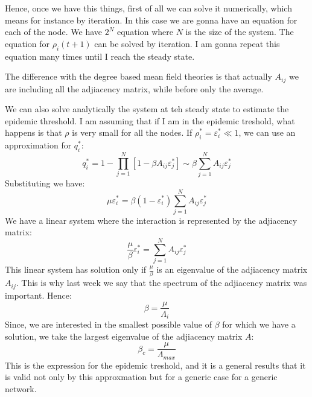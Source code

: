 \documentclass[../main/main.tex]{subfiles}
\begin{document}
Hence, once we have this things, first of all we can solve it numerically, which means for instance by iteration. In this case we are gonna have an equation for each of the node. We have \( 2^N \) equation where \( N \) is the size of the system. The equation for \( \rho _i (t+1) \) can be solved by iteration. I am gonna repeat this equation many times until I reach the steady state.

The difference with the degree based mean field theories is that actually \( A_{ij} \) we are including all the adjiacency matrix, while before only the average.

We can also solve analytically the system at teh steady state to estimate the epidemic threshold.
I am assuming that if I am in the epidemic treshold, what happens is that \( \rho  \) is very small for all the nodes. If \( \rho _i^* = \varepsilon _i^* \ll 1 \), we can use an approximation for \( q_i^* \):
\begin{equation*}
  q_i^* = 1 - \prod_{j=1}^{N} [1- \beta A_{ij} \varepsilon _j^*] \sim \beta \sum_{j=1}^{N} A_{ij} \varepsilon _j^*
\end{equation*}
Substituting we have:
\begin{equation*}
  \mu \varepsilon _i^* = \beta (1- \varepsilon _i^*) \sum_{j=1}^{N} A_{ij} \varepsilon _{j}^*
\end{equation*}
We have a linear system where the interaction is represented by the adjiacency matrix:
\begin{equation*}
  \frac{\mu }{\beta } \varepsilon _i^* = \sum_{j=1}^{N} A_{ij} \varepsilon _j^*
\end{equation*}
This linear system has solution only if \( \frac{\mu }{\beta } \) is an eigenvalue of the adjiacency matrix \( A_{ij} \). This is why last week we say that the spectrum of the adjiacency matrix was important.
Hence:
\begin{equation*}
  \beta = \frac{\mu }{\Lambda _i}
\end{equation*}
Since, we are interested in the smallest possible value of \( \beta  \) for which we have a solution, we take the largest eigenvalue of the adjiacency matrix \( A \):
\begin{equation*}
  \beta _c = \frac{\mu }{\Lambda _{max}}
\end{equation*}
This is the expression for the epidemic treshold, and it is a general results that it is valid not only by this approxmation but for a generic case for a generic network.
\end{document}
